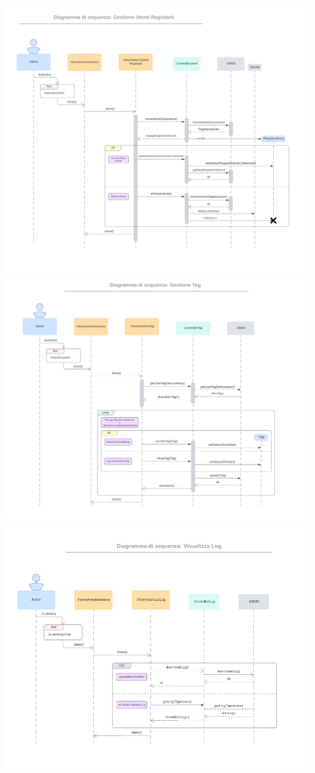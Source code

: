 \includegraphics[width=1\textwidth]{assets/img/sequenza_dettaglio/admin-1.png}\\
\includegraphics[width=1\textwidth]{assets/img/sequenza_dettaglio/admin-2.png}\\
\includegraphics[width=1\textwidth]{assets/img/sequenza_dettaglio/admin-3.png}\\